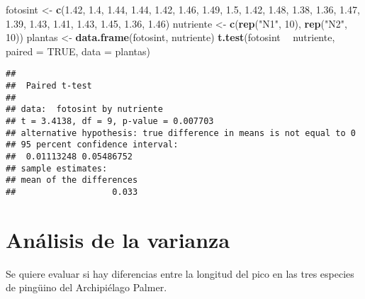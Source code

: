 \documentclass[
]{book}
\newenvironment{Shaded}{\begin{snugshade}}{\end{snugshade}}
\newcommand{\DataTypeTok}[1]{\textcolor[rgb]{0.13,0.29,0.53}{#1}}
\newcommand{\DecValTok}[1]{\textcolor[rgb]{0.00,0.00,0.81}{#1}}
\newcommand{\FloatTok}[1]{\textcolor[rgb]{0.00,0.00,0.81}{#1}}
\newcommand{\KeywordTok}[1]{\textcolor[rgb]{0.13,0.29,0.53}{\textbf{#1}}}
\newcommand{\NormalTok}[1]{#1}
\newcommand{\OperatorTok}[1]{\textcolor[rgb]{0.81,0.36,0.00}{\textbf{#1}}}
\newcommand{\OtherTok}[1]{\textcolor[rgb]{0.56,0.35,0.01}{#1}}
\newcommand{\StringTok}[1]{\textcolor[rgb]{0.31,0.60,0.02}{#1}}
\begin{document}
\begin{Shaded}
\begin{Highlighting}[]
\NormalTok{fotosint <-}\StringTok{ }\KeywordTok{c}\NormalTok{(}\FloatTok{1.42}\NormalTok{, }\FloatTok{1.4}\NormalTok{, }\FloatTok{1.44}\NormalTok{, }\FloatTok{1.44}\NormalTok{, }\FloatTok{1.42}\NormalTok{, }\FloatTok{1.46}\NormalTok{, }\FloatTok{1.49}\NormalTok{, }\FloatTok{1.5}\NormalTok{, }\FloatTok{1.42}\NormalTok{, }\FloatTok{1.48}\NormalTok{, }\FloatTok{1.38}\NormalTok{, }\FloatTok{1.36}\NormalTok{, }\FloatTok{1.47}\NormalTok{, }\FloatTok{1.39}\NormalTok{, }\FloatTok{1.43}\NormalTok{, }\FloatTok{1.41}\NormalTok{, }\FloatTok{1.43}\NormalTok{, }\FloatTok{1.45}\NormalTok{, }\FloatTok{1.36}\NormalTok{, }\FloatTok{1.46}\NormalTok{)}
\NormalTok{nutriente <-}\StringTok{ }\KeywordTok{c}\NormalTok{(}\KeywordTok{rep}\NormalTok{(}\StringTok{"N1"}\NormalTok{, }\DecValTok{10}\NormalTok{), }\KeywordTok{rep}\NormalTok{(}\StringTok{"N2"}\NormalTok{, }\DecValTok{10}\NormalTok{))}
\NormalTok{plantas <-}\StringTok{ }\KeywordTok{data.frame}\NormalTok{(fotosint, nutriente)}
\KeywordTok{t.test}\NormalTok{(fotosint }\OperatorTok{~}\StringTok{ }\NormalTok{nutriente, }\DataTypeTok{paired =} \OtherTok{TRUE}\NormalTok{, }\DataTypeTok{data =}\NormalTok{ plantas)}
\end{Highlighting}
\end{Shaded}

\begin{verbatim}
## 
##  Paired t-test
## 
## data:  fotosint by nutriente
## t = 3.4138, df = 9, p-value = 0.007703
## alternative hypothesis: true difference in means is not equal to 0
## 95 percent confidence interval:
##  0.01113248 0.05486752
## sample estimates:
## mean of the differences 
##                   0.033
\end{verbatim}

\hypertarget{anuxe1lisis-de-la-varianza}{%
\section{Análisis de la varianza}\label{anuxe1lisis-de-la-varianza}}

Se quiere evaluar si hay diferencias entre la longitud del pico en las tres especies de pingüino del Archipiélago Palmer.

\begin{Shaded}
\end{Shaded}
\end{document}
